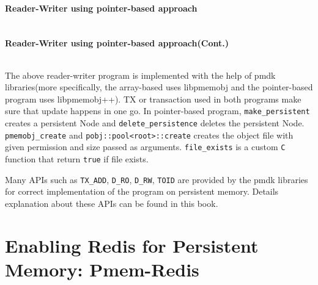 \documentclass[11pt,swedish, openany, oneside]{book}
\begin{document}


     \begin{minipage}[fontsize = \footnotesize]{\linewidth}
        \paragraph{Reader-Writer using pointer-based approach}
        \label{lst:linkedlist_code}
        \inputminted[firstline=1,lastline=39]{c++}{code/ll.cc}
    \end{minipage}
     \begin{minipage}[fontsize = \footnotesize]{\linewidth}
        \paragraph{Reader-Writer using pointer-based approach(Cont.)}
        \label{lst:list_code}
        \inputminted[firstline=40,lastline=73]{c++}{code/ll.cc}
    \end{minipage}

The above reader-writer program is implemented with the help of pmdk libraries(more specifically, the array-based uses libpmemobj and the pointer-based program uses libpmemobj++). TX or transaction used in both programs make sure that update happens in one go. In pointer-based program, \verb|make_persistent| creates a persistent Node and \verb|delete_persistence| deletes the persistent Node. \verb|pmemobj_create| and \verb|pobj::pool<root>::create| creates the object file with given permission and size passed as arguments. \verb|file_exists| is a custom \verb|C| function that return \verb|true| if file exists.

Many APIs such as \verb|TX_ADD|, \verb|D_RO|, \verb|D_RW|, \verb|TOID| are provided by the pmdk libraries for correct implementation of the program on persistent memory. Details explanation about these APIs can be found in this \cite{Scargall2020} book.
\section{Enabling Redis for Persistent Memory: Pmem-Redis}
\end{document}
